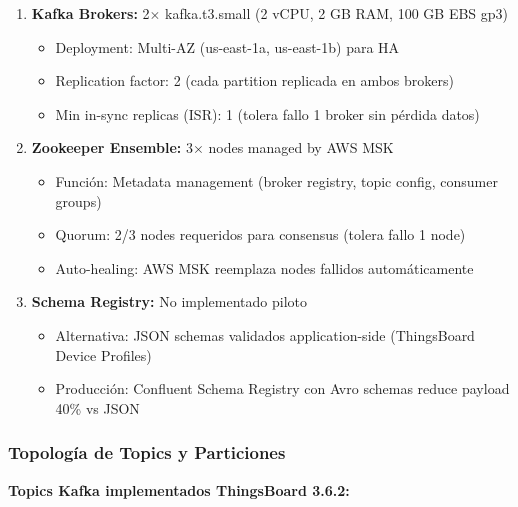 \begin{enumerate}
    \item \textbf{Kafka Brokers:} 2$\times$ kafka.t3.small (2 vCPU, 2 GB RAM, 100 GB EBS gp3)
    \begin{itemize}
        \item Deployment: Multi-AZ (us-east-1a, us-east-1b) para HA
        \item Replication factor: 2 (cada partition replicada en ambos brokers)
        \item Min in-sync replicas (ISR): 1 (tolera fallo 1 broker sin pérdida datos)
    \end{itemize}
    
    \item \textbf{Zookeeper Ensemble:} 3$\times$ nodes managed by AWS MSK
    \begin{itemize}
        \item Función: Metadata management (broker registry, topic config, consumer groups)
        \item Quorum: 2/3 nodes requeridos para consensus (tolera fallo 1 node)
        \item Auto-healing: AWS MSK reemplaza nodes fallidos automáticamente
    \end{itemize}
    
    \item \textbf{Schema Registry:} No implementado piloto
    \begin{itemize}
        \item Alternativa: JSON schemas validados application-side (ThingsBoard Device Profiles)
        \item Producción: Confluent Schema Registry con Avro schemas reduce payload 40\% vs JSON
    \end{itemize}
\end{enumerate}

\subsubsection{Topología de Topics y Particiones}
\label{sec:server-kafka-topics}

\textbf{Topics Kafka implementados ThingsBoard 3.6.2:}

